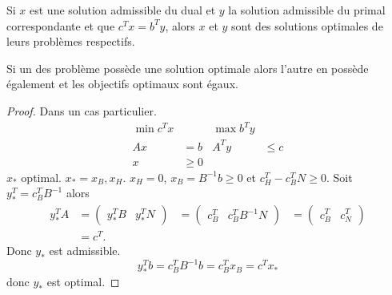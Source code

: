 \begin{mycorr}
  Si $x$ est une solution admissible du dual et $y$ la solution
  admissible du primal correspondante
  et que $c^Tx = b^Ty$, alors $x$ et $y$ sont
  des solutions optimales de leurs problèmes respectifs.
\end{mycorr}

\begin{mytheo}
  Si un des problème possède une solution optimale alors l'autre en possède
  également et les objectifs optimaux sont égaux.
  \begin{proof}
    Dans un cas particulier.
    \begin{align*}
      \min c^T x & & \max b^T y\\
      Ax & = b & A^Ty & \leq c\\
      x & \geq 0
    \end{align*}
    $x_*$ optimal.
    $x_* = x_B, x_H$.
    $x_H = 0$, $x_B = B^{-1}b \geq 0$ et $c_H^T - c_B^T N \geq 0$.
    Soit $y_*^T = c_B^T B^{-1}$ alors
    \begin{align*}
      y_*^TA & = \begin{pmatrix}y_*^TB & y_*^TN\end{pmatrix}
      & = \begin{pmatrix}c_B^T & c_B^TB^{-1}N\end{pmatrix}
      & = \begin{pmatrix}c_B^T & c_N^T\end{pmatrix}\\
      & =  c^T.
    \end{align*}
    Donc $y_*$ est admissible.
    \[ y_*^Tb = c_B^TB^{-1}b = c_B^Tx_B = c^Tx_* \]
    donc $y_*$ est optimal.
  \end{proof}
\end{mytheo}

